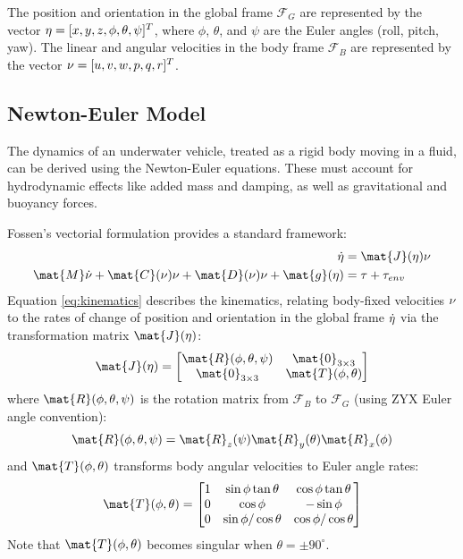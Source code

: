 The position and orientation in the global frame $\mathcal{F}_G$ are represented by the vector $\mathbf{\eta} = [x, y, z, \phi, \theta, \psi]^T$, where $\phi$, $\theta$, and $\psi$ are the Euler angles (roll, pitch, yaw). The linear and angular velocities in the body frame $\mathcal{F}_B$ are represented by the vector $\mathbf{\nu} = [u, v, w, p, q, r]^T$.

\subsection{Newton-Euler Model}
The dynamics of an underwater vehicle, treated as a rigid body moving in a fluid, can be derived using the Newton-Euler equations. These must account for hydrodynamic effects like added mass and damping, as well as gravitational and buoyancy forces.

Fossen's vectorial formulation provides a standard framework:
\begin{align} %
    \dot{\vect{\eta}} &= \mat{J}(\vect{\eta})\vect{\nu} \label{eq:kinematics} \\
    \mat{M}\dot{\vect{\nu}} + \mat{C}(\vect{\nu})\vect{\nu} + \mat{D}(\vect{\nu})\vect{\nu} + \mat{g}(\vect{\eta}) &= \vect{\tau} + \vect{\tau}_{env} \label{eq:dynamics}
\end{align}
Equation \eqref{eq:kinematics} describes the kinematics, relating body-fixed velocities $\mathbf{\nu}$ to the rates of change of position and orientation in the global frame $\dot{\mathbf{\eta}}$ via the transformation matrix $\mat{J}(\vect{\eta})$:
\begin{equation}
    \mat{J}(\vect{\eta}) =
    \begin{bmatrix}
        \mat{R}(\phi,\theta,\psi) & \mat{0}_{3\times3} \\
        \mat{0}_{3\times3} & \mat{T}(\phi,\theta)
    \end{bmatrix}
\end{equation}
where $\mat{R}(\phi,\theta,\psi)$ is the rotation matrix from $\mathcal{F}_B$ to $\mathcal{F}_G$ (using ZYX Euler angle convention):
\begin{equation}
    \mat{R}(\phi,\theta,\psi) = \mat{R}_z(\psi)\mat{R}_y(\theta)\mat{R}_x(\phi)
\end{equation}
and $\mat{T}(\phi,\theta)$ transforms body angular velocities to Euler angle rates:
\begin{equation}
    \mat{T}(\phi,\theta) =
    \begin{bmatrix}
        1 & \sin\phi\tan\theta & \cos\phi\tan\theta \\
        0 & \cos\phi & -\sin\phi \\
        0 & \sin\phi/\cos\theta & \cos\phi/\cos\theta
    \end{bmatrix}
\end{equation}
Note that $\mat{T}(\phi,\theta)$ becomes singular when $\theta = \pm 90^\circ$.

